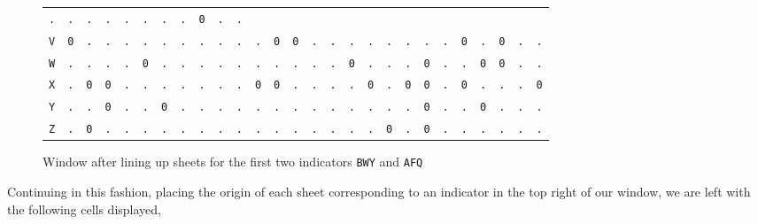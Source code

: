 \begin{figure}[H]
\begin{center}
{\begin{tabular}{c|cccccccccccccccccccccccccc}
        \texttt{.} & \texttt{.} & \texttt{.} & \texttt{.} &
        \texttt{.} & \texttt{.} & \texttt{.} & \texttt{.} &
        \texttt{0} & \texttt{.} & \texttt{.}                             \\
        \texttt{V} & \texttt{0} & \texttt{.} & \texttt{.} &
        \texttt{.} & \texttt{.} & \texttt{.} & \texttt{.} &
        \texttt{.} & \texttt{.} & \texttt{.} & \texttt{.} &
        \texttt{0} & \texttt{0} & \texttt{.} & \texttt{.} &
        \texttt{.} & \texttt{.} & \texttt{.} & \texttt{.} &
        \texttt{.} & \texttt{.} & \texttt{0} & \texttt{.} &
        \texttt{0} & \texttt{.} & \texttt{.}                             \\
        \texttt{W} & \texttt{.} & \texttt{.} & \texttt{.} &
        \texttt{.} & \texttt{0} & \texttt{.} & \texttt{.} &
        \texttt{.} & \texttt{.} & \texttt{.} & \texttt{.} &
        \texttt{.} & \texttt{.} & \texttt{.} & \texttt{.} &
        \texttt{0} & \texttt{.} & \texttt{.} & \texttt{.} &
        \texttt{0} & \texttt{.} & \texttt{.} & \texttt{0} &
        \texttt{0} & \texttt{.} & \texttt{.}                             \\
        \texttt{X} & \texttt{.} & \texttt{0} & \texttt{0} &
        \texttt{.} & \texttt{.} & \texttt{.} & \texttt{.} &
        \texttt{.} & \texttt{.} & \texttt{.} & \texttt{0} &
        \texttt{0} & \texttt{.} & \texttt{.} & \texttt{.} &
        \texttt{.} & \texttt{0} & \texttt{.} & \texttt{0} &
        \texttt{0} & \texttt{.} & \texttt{0} & \texttt{.} &
        \texttt{.} & \texttt{.} & \texttt{0}                             \\
        \texttt{Y} & \texttt{.} & \texttt{.} & \texttt{0} &
        \texttt{.} & \texttt{.} & \texttt{0} & \texttt{.} &
        \texttt{.} & \texttt{.} & \texttt{.} & \texttt{.} &
        \texttt{.} & \texttt{.} & \texttt{.} & \texttt{.} &
        \texttt{.} & \texttt{.} & \texttt{.} & \texttt{.} &
        \texttt{0} & \texttt{.} & \texttt{.} & \texttt{0} &
        \texttt{.} & \texttt{.} & \texttt{.}                             \\
        \texttt{Z} & \texttt{.} & \texttt{0} & \texttt{.} &
        \texttt{.} & \texttt{.} & \texttt{.} & \texttt{.} &
        \texttt{.} & \texttt{.} & \texttt{.} & \texttt{.} &
        \texttt{.} & \texttt{.} & \texttt{.} & \texttt{.} &
        \texttt{.} & \texttt{.} & \texttt{0} & \texttt{.} &
        \texttt{0} & \texttt{.} & \texttt{.} & \texttt{.} &
        \texttt{.} & \texttt{.} & \texttt{.}                             \\
      \end{tabular}
    }
  \end{center}
  \caption{Window after lining up sheets for the first two indicators
  \texttt{BWY} and \texttt{AFQ}}
\end{figure}
\noindent Continuing in this fashion, placing the origin of each
sheet corresponding to an indicator in the top right of our window,
we are left with the following cells displayed,

